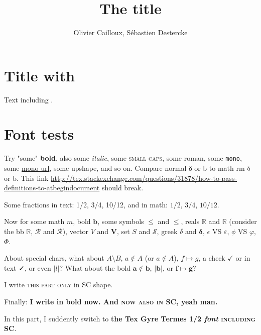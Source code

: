 \documentclass[french, english]{llncs}
\begin{document}
\title{The title}
\author{Olivier Cailloux, Sébastien Destercke}
\makeatletter
\makeatother
\maketitle

\section{Title with \electreTRI}
Text including \electreTRI.

\section{Font tests}
Try "some" \textbf{bold}, also some \textit{italic}, some \textsc{small caps}, some \textrm{roman}, some \texttt{mono}, some \url{mono-url}, some \textup{upshape}, and so on. Compare normal δ or b to math rm $\mathrm{\delta}$ or $\mathrm{b}$.
This link \url{http://tex.stackexchange.com/questions/31878/how-to-pass-definitions-to-atbegindocument} should break.

Some fractions in text: 1/2, 3/4, 10/12, and in math: $1/2$, $3/4$, $10/12$.


Now for some math $m$, bold $\mathbf{b}$, some symbols $≤$ and $\mathbf{≤}$, reals $ℝ$ and $\mathbf{ℝ}$ (consider the bb $\mathbb{R}$, $\mathcal{R}$ and $\mathscr{R}$), vector $V$ and $\mathbf{V}$, set $S$ and $\mathcal{S}$, greek $\delta$ and $\mathbf{\delta}$, $\epsilon$ VS $\varepsilon$, $\phi$ VS $\varphi$, $\Phi$.

About special chars, what about $A \setminus B$, $a ∉ A$ (or $a \notin A$), $f \mapsto g$, a check $✓$ or in text ✓, or even $\lvert l\rvert$? What about the bold $\mathbf{a \notin b}$, $\mathbf{\lvert b\rvert}$, or $\mathbf{f \mapsto g}$?

I write \textsc{this part only} in SC shape.

Finally: \textbf{I write in bold now. And \textsc{now also in SC}, yeah man.}

{In this part, I suddently \texgyretermesfamily switch to \textbf{the Tex Gyre Termes 1/2 \textit{font} \textsc{including SC}}.}

\end{document}
